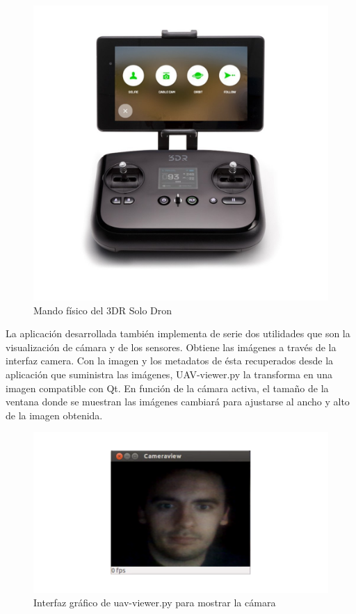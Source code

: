 \begin{figure}[H]
  \centering
  \includegraphics[scale=0.2]{imagenes/mando.jpg}
  \caption{Mando físico del 3DR Solo Dron}
  \label{fig:mando}
\end{figure}

La aplicación desarrollada también implementa de serie dos utilidades que son la visualización de cámara y de los sensores. Obtiene las imágenes a través de la interfaz camera. Con la imagen y los metadatos de ésta recuperados desde la aplicación que suministra las imágenes, UAV-viewer.py la transforma en una imagen compatible con Qt. En función de la cámara activa, el tamaño de la ventana donde se muestran las imágenes cambiará para ajustarse al ancho y alto de la imagen obtenida.

\begin{figure}[H]
  \centering
  \includegraphics[scale=0.4]{imagenes/cameraView.png}
  \caption{Interfaz gráfico de uav-viewer.py para mostrar la cámara}
  \label{fig:cameraView}
\end{figure}

